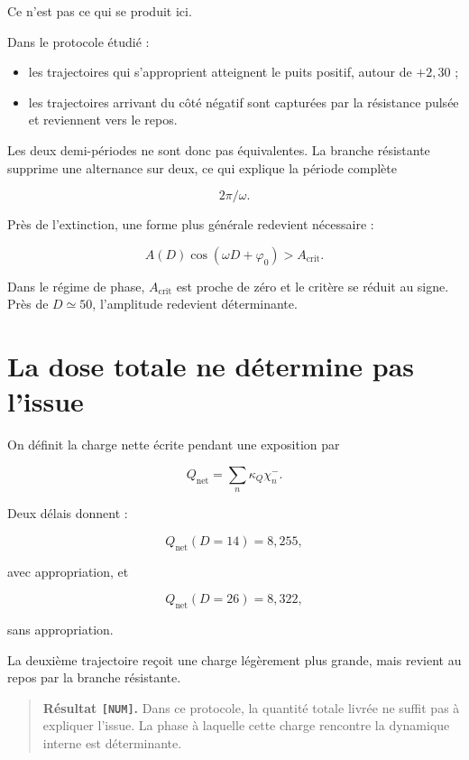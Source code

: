 Ce n'est pas ce qui se produit ici.

Dans le protocole étudié :

\begin{itemize}
\tightlist
\item
  les trajectoires qui s'approprient atteignent le puits positif, autour
  de \(+2{,}30\) ;
\item
  les trajectoires arrivant du côté négatif sont capturées par la
  résistance pulsée et reviennent vers le repos.
\end{itemize}

Les deux demi-périodes ne sont donc pas équivalentes. La branche
résistante supprime une alternance sur deux, ce qui explique la période
complète

\[
2\pi/\omega.
\]

Près de l'extinction, une forme plus générale redevient nécessaire :

\[
A(D)\cos(\omega D+\varphi_0)
>
A_{\mathrm{crit}}.
\]

Dans le régime de phase, \(A_{\mathrm{crit}}\) est proche de zéro et le critère se réduit au signe. Près de \(D\simeq50\), l'amplitude redevient déterminante.

\chapter{La dose totale ne détermine pas l'issue}\label{t2-la-dose-totale-ne-determine-pas-lissue}

On définit la charge nette écrite pendant une exposition par

\[
Q_{\mathrm{net}}
=
\sum_n
\kappa_Q\chi_n^-.
\]

Deux délais donnent :

\[
Q_{\mathrm{net}}(D=14)=8{,}255,
\]

avec appropriation, et

\[
Q_{\mathrm{net}}(D=26)=8{,}322,
\]

sans appropriation.

La deuxième trajectoire reçoit une charge légèrement plus grande, mais revient au repos par la branche résistante.

\begin{quote}
\textbf{Résultat \texttt{{[}NUM{]}}.} Dans ce protocole, la quantité
totale livrée ne suffit pas à expliquer l'issue. La phase à laquelle
cette charge rencontre la dynamique interne est déterminante.
\end{quote}

